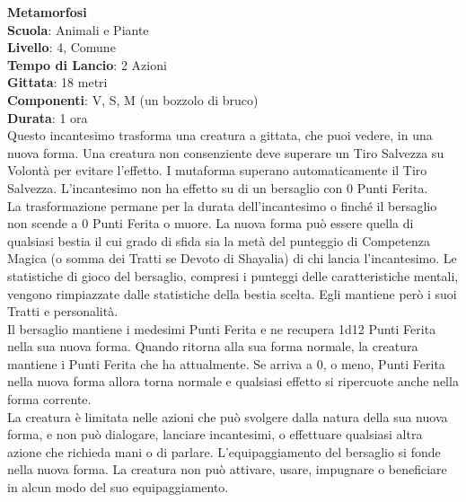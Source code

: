 \begin{multicols}{2}
\medskip\textbf{Metamorfosi}\\
\textbf{Scuola}: Animali e Piante\\
\textbf{Livello}: 4, Comune\\
\textbf{Tempo di Lancio}: 2 Azioni\\
\textbf{Gittata}: 18 metri\\
\textbf{Componenti}: V, S, M (un bozzolo di bruco)\\
\textbf{Durata}: 1 ora \\
Questo incantesimo trasforma una creatura a gittata, che puoi vedere, in una nuova forma. Una creatura non consenziente deve superare un Tiro Salvezza su Volontà per evitare l'effetto. I mutaforma superano automaticamente il Tiro Salvezza. L'incantesimo non ha effetto su di un bersaglio con 0 Punti Ferita. \\
La trasformazione permane per la durata dell'incantesimo o finché il bersaglio non scende a 0 Punti Ferita o muore. La nuova forma può essere quella di qualsiasi bestia il cui grado di sfida sia la metà del punteggio di Competenza Magica (o somma dei Tratti se Devoto di Shayalia) di chi lancia l'incantesimo. Le statistiche di gioco del bersaglio, compresi i punteggi delle caratteristiche mentali, vengono rimpiazzate dalle statistiche della bestia scelta. Egli mantiene però i suoi Tratti e personalità.\\
Il bersaglio mantiene i medesimi Punti Ferita e ne recupera 1d12 Punti Ferita nella sua nuova forma. Quando ritorna alla sua forma normale, la creatura mantiene i Punti Ferita che ha attualmente. Se arriva a 0, o meno, Punti Ferita nella nuova forma allora torna normale e qualsiasi effetto si ripercuote anche nella forma corrente.\\
La creatura è limitata nelle azioni che può svolgere dalla natura della sua nuova forma, e non può dialogare, lanciare incantesimi, o effettuare qualsiasi altra azione che richieda mani o di parlare. L'equipaggiamento del bersaglio si fonde nella nuova forma. La creatura non può attivare, usare, impugnare o beneficiare in alcun modo del suo equipaggiamento.


\end{multicols}
